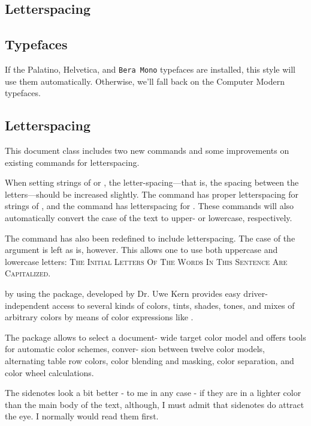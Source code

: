 \begin{multicols}{2}
\section{Letterspacing}

\subsection{Typefaces}\label{sec:typefaces}
If the Palatino, \textsf{Helvetica}, and \texttt{Bera Mono} typefaces are installed, this style
will use them automatically.  Otherwise, we'll fall back on the Computer Modern
typefaces.

\subsection{Letterspacing}\label{sec:letterspacing}
This document class includes two new commands and some improvements on
existing commands for letterspacing.

When setting strings of  or , the
letter-spacing---that is, the spacing between the letters---should be
increased slightly.\cite{Bringhurst2005}  The  command has proper letterspacing for
strings of , and the  command
has letterspacing for .  These commands
will also automatically convert the case of the text to upper- or
lowercase, respectively.

The  command has also been redefined to include
letterspacing.  The case of the  argument is left as is,
however.  This allows one to use both uppercase and lowercase letters:
\textsc{The Initial Letters Of The Words In This Sentence Are Capitalized.}
  

 by using the 
 package, developed by  Dr. Uwe Kern provides easy driver-independent access to several kinds of colors,
tints, shades, tones, and mixes of arbitrary colors by means of color expressions 
like . 

The package allows to select a document-
wide target color model and offers tools for automatic color schemes, conver-
sion between twelve color models, alternating table row colors, color blending
and masking, color separation, and color wheel calculations.

The sidenotes look a bit better - to me in any case - if they are in a lighter color than the main body of the text,
although, I must admit that sidenotes do attract the eye. I normally would read them first.
\end{multicols}


